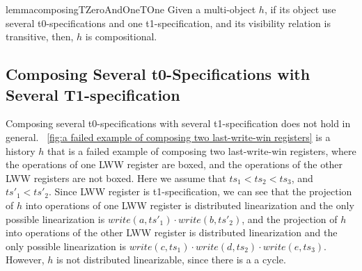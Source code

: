 {\begin{restatable}{lemma}{composingTZeroAndOneTOne}
\label{lemma:several t0-specifications and one t1-specification can be composed}
Given a multi-object $h$, if its object use several t0-specifications and one t1-specification, and its visibility relation is transitive, then, $h$ is compositional.
\end{restatable}




\subsection{Composing Several t0-Specifications with Several T1-specification}
\label{lemma:composing several t0-specification with several t1-specification}

Composing several t0-specifications with several t1-specification does not hold in general. \figurename~\ref{fig:a failed example of composing two last-write-win registers} is a history $h$ that is a failed example of composing two last-write-win registers, where the operations of one LWW register are boxed, and the operations of the other LWW registers are not boxed. Here we assume that $\mathit{ts}_1 < \mathit{ts}_2 < \mathit{ts}_3$, and $\mathit{ts}'_1 < \mathit{ts}'_2$. Since LWW register is t1-specification, we can see that the projection of $h$ into operations of one LWW register is distributed linearization and the only possible linearization is $\mathit{write}(a,\mathit{ts}'_1) \cdot \mathit{write}(b,\mathit{ts}'_2)$, and the projection of $h$ into operations of the other LWW register is distributed linearization and the only possible linearization is $\mathit{write}(c,\mathit{ts}_1) \cdot \mathit{write}(d,\mathit{ts}_2) \cdot \mathit{write}(e,\mathit{ts}_3)$. However, $h$ is not distributed linearizable, since there is a a cycle.

}
